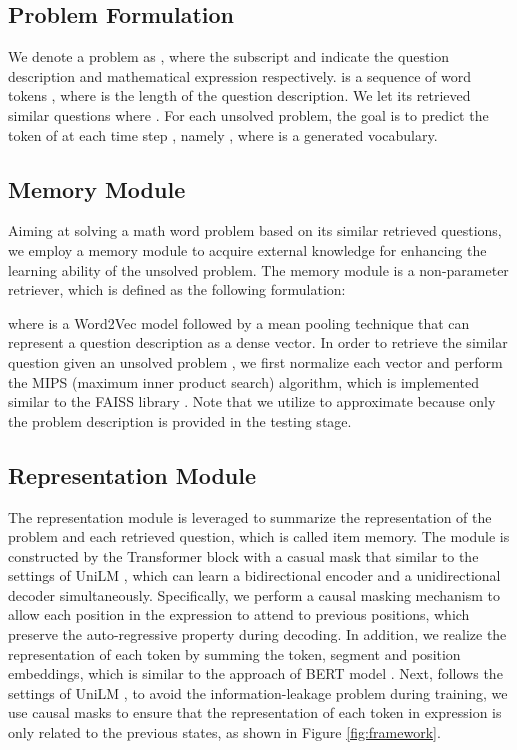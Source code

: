 \documentclass[11pt, a4paper]{article}
\begin{document}
\subsection{Problem Formulation}
We denote a problem as , where the subscript  and  indicate the question description and mathematical expression respectively.  is a sequence of word tokens , where  is the length of the question description. We let its  retrieved similar questions  where . For each unsolved problem, the goal is to predict the token of  at each time step , namely , where  is a generated vocabulary.

\subsection{Memory Module}
Aiming at solving a math word problem based on its similar retrieved questions, we employ a memory module to acquire external knowledge for enhancing the learning ability of the unsolved problem. The memory module is a non-parameter retriever, which is defined as the following formulation:

where  is a Word2Vec \cite{mikolov2013efficient} model followed by a mean pooling technique that can represent a question description as a dense vector. In order to retrieve the similar question  given an unsolved problem , we first normalize each vector and perform the MIPS (maximum inner product search) algorithm, which is implemented similar to the FAISS library \cite{JDH17}. Note that we utilize  to approximate  because only the problem description is provided in the testing stage.


\subsection{Representation Module}
The representation module is leveraged to summarize the representation of the problem and each retrieved question, which is called item memory. The module is constructed by the Transformer \cite{vaswani2017attention} block with a casual mask that similar to the settings of UniLM \cite{dong2019unified}, which can learn a bidirectional encoder and a unidirectional decoder simultaneously. Specifically, we perform a causal masking mechanism to allow each position in the expression to attend to previous positions, which preserve the auto-regressive property during decoding. In addition, we realize the representation of each token by summing the token, segment and position embeddings, which is similar to the approach of BERT model \cite{devlin2019bert}.
Next, follows the settings of UniLM \cite{dong2019unified}, to avoid the information-leakage problem during training, we use causal masks to ensure that the representation of each token in expression is only related to the previous states, as shown in Figure \ref{fig:framework}.
\end{document}
